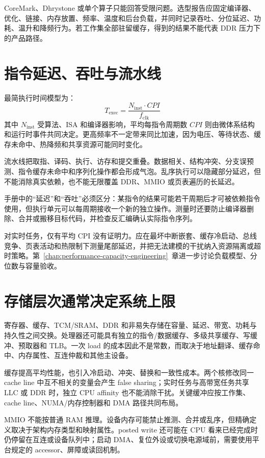 CoreMark、Dhrystone 或单个算子只能回答受限问题。选型报告应固定编译器、优化、链接、内存放置、频率、温度和后台负载，并同时记录吞吐、分位延迟、功耗、温升和降频行为。若工作集全部驻留缓存，得到的结果不能代表 DDR 压力下的产品路径。

\section{指令延迟、吞吐与流水线}

最简执行时间模型为：
\begin{equation}
  T_{\mathrm{exec}} = \frac{N_{\mathrm{inst}}\cdot CPI}{f_{\mathrm{clk}}}
\end{equation}
其中 $N_{\mathrm{inst}}$ 受算法、ISA 和编译器影响，平均每指令周期数 $CPI$ 则由微体系结构和运行时事件共同决定。更高频率不一定带来同比加速，因为电压、等待状态、缓存未命中、热降频和共享资源可能同时变化。

流水线把取指、译码、执行、访存和提交重叠。数据相关、结构冲突、分支误预测、指令缓存未命中和序列化操作都会形成气泡。乱序执行可以隐藏部分延迟，但不能消除真实依赖，也不能无限覆盖 DDR、MMIO 或页表遍历的长延迟。

手册中的“延迟”和“吞吐”必须区分：某指令的结果可能若干周期后才可被依赖指令使用，但执行单元可以每周期接收一个新的独立操作。测量时还要防止编译器删除、合并或搬移目标代码，并检查反汇编确认实际指令序列。

对实时任务，仅有平均 CPI 没有证明力。应在最坏中断嵌套、缓存冷启动、总线竞争、页表活动和热限制下测量尾部延迟，并把无法建模的干扰纳入资源隔离或超时策略。第~\ref{chap:performance-capacity-engineering}~章进一步讨论负载模型、分位数与容量验收。

\section{存储层次通常决定系统上限}

寄存器、缓存、TCM/SRAM、DDR 和非易失存储在容量、延迟、带宽、功耗与持久性之间交换。处理器还可能具有独立的指令/数据缓存、多级共享缓存、写缓冲、预取器和 TLB。一次 load 的成本因此不是常数，而取决于地址翻译、缓存命中、内存属性、互连仲裁和其他主设备。

缓存提高平均性能，也引入冷启动、冲突、替换和一致性成本。两个核修改同一 cache line 中互不相关的变量会产生 false sharing；实时任务与高带宽任务共享 LLC 或 DDR 时，独立 CPU affinity 也不能消除干扰。关键缓冲应按工作集、cache line、NUMA/内存控制器和 DMA 路径共同布局。

MMIO 不能按普通 RAM 推理。设备内存可能禁止推测、合并或乱序，但精确定义取决于架构内存类型和映射属性。posted write 还可能在 CPU 看来已经完成时仍停留在互连或设备队列中；启动 DMA、复位外设或切换电源域前，需要使用平台规定的 accessor、屏障或读回机制。

